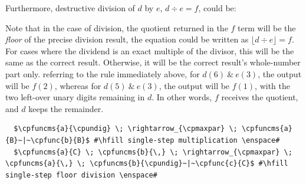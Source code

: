 Furthermore, destructive division of \(d\) by \(e\), \(d \div e = f\), could be:

Note that in the case of division, the quotient returned in the \(f\) term will be the \emph{floor} of the precise division result, \ie{} the equation could be written as \(\lfloor d \div e \rfloor = f\).  For cases where the dividend is an exact multiple of the divisor, this will be the same as the correct result.  Otherwise, it will be the correct result's whole-number part only.  \Eg{} referring to the rule immediately above, for \(d(6)~\&~e(3)\), the output will be \(f(2)\), whereas for \(d(5)~\&~e(3)\), the output will be \(f(1)\), with the two left-over unary digits remaining in \(d\).  In other words, \(f\) receives the quotient, and \(d\) keeps the remainder.

\lstset{xleftmargin=.5in, xrightmargin=.5in} 
\begin{lstlisting}
  $\cpfuncms{a}{\cpundig} \; \rightarrow_{\cpmaxpar} \; \cpfuncms{a}{B}~|~\cpfunc{b}{B}$ #\hfill single-step multiplication \enspace#
  $\cpfuncms{a}{C} \; \cpfuncms{b}{\,} \; \rightarrow_{\cpmaxpar} \; \cpfuncms{a}{\,} \; \cpfuncms{b}{\cpundig}~|~\cpfunc{c}{C}$ #\hfill single-step floor division \enspace#
\end{lstlisting}